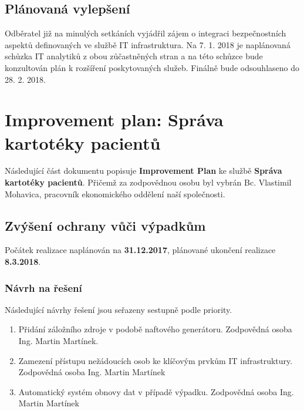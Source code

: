 \documentclass[11pt, a4paper, titlepage]{article}
\begin{document}
	\subsection{Plánovaná vylepšení}

	Odběratel již na minulých setkáních vyjádřil zájem o integraci bezpečnostních aspektů definovaných ve službě IT infrastruktura. Na 7. 1. 2018 je naplánovaná schůzka IT analytiků z obou zůčastněných stran a na této schůzce bude konzultován plán k rozšíření poskytovaných služeb. Finálně bude odsouhlaseno do 28. 2. 2018. 


	\section*{Improvement plan: Správa kartotéky pacientů}

	\vspace{0.5em}

	\noindent\makebox[\linewidth]{\rule{17.5cm}{0.4pt}}

	\vspace{0.5em}

	\noindent Následující část dokumentu popisuje \textbf{Improvement Plan} ke službě \textbf{Správa kartotéky pacientů}. Přičemž za zodpovědnou osobu byl vybrán Bc. Vlastimil Mohavica, pracovník ekonomického oddělení naší společnosti.

	\noindent\makebox[\linewidth]{\rule{17.5cm}{0.4pt}}

	\subsection{Zvýšení ochrany vůči výpadkům}

	Počátek realizace naplánován na \textbf{31.12.2017}, plánované ukončení realizace \textbf{8.3.2018}.

	\subsubsection{Návrh na řešení}

	Následující návrhy řešení jsou seřazeny sestupně podle priority.

	\begin{enumerate}
		\item Přidání záložního zdroje v podobě naftového generátoru. Zodpovědná osoba Ing. Martin Martínek.
		\item Zamezení přístupu nežádoucích osob ke klíčovým prvkům IT infrastruktury. Zodpovědná osoba Ing. Martin Martínek
		\item Automatický systém obnovy dat v případě výpadku. Zodpovědná osoba Ing. Martin Martínek
	\end{enumerate}
\end{document}
